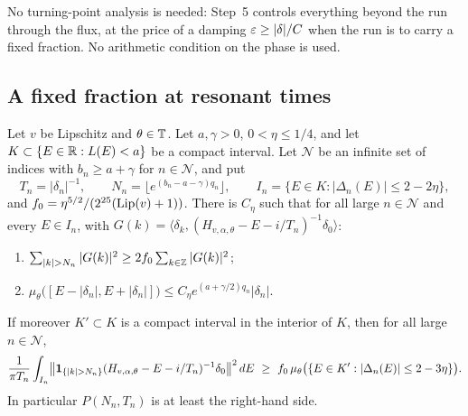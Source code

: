 No turning-point analysis is needed: Step~5 controls everything beyond the run through the flux, at the price of a damping $\varepsilon\ge|\delta|/C$ when the run is to carry a fixed fraction. No arithmetic condition on the phase is used.

\subsection{A fixed fraction at resonant times}\label{sec:fraction}

\begin{proposition}\label{prop:fraction}
Let $v$ be Lipschitz and $\theta\in\mathbb T$. Let $a,\gamma>0$, $0<\eta\le1/4$, and let $K\subset\{E\in\mathbb R:L(E)<a\}$ be a compact interval. Let $\mathcal N$ be an infinite set of indices with $b_n\ge a+\gamma$ for $n\in\mathcal N$, and put
\[
T_n=|\delta_n|^{-1},\qquad N_n=\bigl\lfloor e^{(b_n-a-\gamma)q_n}\bigr\rfloor,\qquad I_n=\{E\in K:|\Delta_n(E)|\le2-2\eta\},
\]
and $f_0=\eta^{5/2}/(2^{25}(\operatorname{Lip}(v)+1))$.
There is $C_\eta$ such that for all large $n\in\mathcal N$ and every $E\in I_n$, with $G(k)=\langle\delta_k,(H_{v,\alpha,\theta}-E-i/T_n)^{-1}\delta_0\rangle$:
\begin{enumerate}
\item $\sum_{|k|>N_n}|G(k)|^2\ge2f_0\sum_{k\in\Z}|G(k)|^2$;
\item $\mu_\theta\bigl([E-|\delta_n|,E+|\delta_n|]\bigr)\le C_\eta e^{(a+\gamma/2)q_n}|\delta_n|$.
\end{enumerate}
If moreover $K'\subset K$ is a compact interval in the interior of $K$, then for all large $n\in\mathcal N$,
\[
\frac1{\pi T_n}\int_{I_n}\bigl\|\un_{\{|k|>N_n\}}(H_{v,\alpha,\theta}-E-i/T_n)^{-1}\delta_0\bigr\|^2\,dE\ \ge\ f_0\,\mu_\theta\bigl(\{E\in K':|\Delta_n(E)|\le2-3\eta\}\bigr).
\]
In particular $P(N_n,T_n)$ is at least the right-hand side.
\end{proposition}


